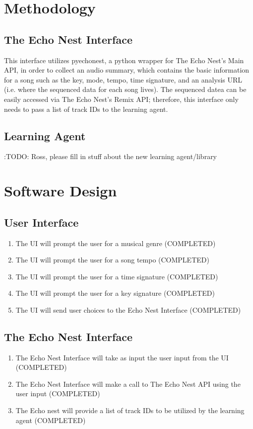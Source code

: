 \documentclass{article}
\begin{document}
\section{Methodology}
\subsection{The Echo Nest Interface}
This interface utilizes pyechonest, a python wrapper for The Echo Nest's Main API, in order to collect an 
audio summary, which contains the basic information for a song such as the key, mode, tempo, time signature, 
and an analysis URL (i.e. where the sequenced data for each song lives). The sequenced datea
can be easily accessed via The Echo Nest's Remix API; therefore, this interface only needs to pass a list of
track IDs to the learning agent.

\subsection{Learning Agent}
\Large:{TODO: Ross, please fill in stuff about the new learning agent/library}

\section{Software Design}
\subsection{User Interface}
\begin{enumerate}
\item The UI will prompt the user for a musical genre (COMPLETED)
\item The UI will prompt the user for a song tempo (COMPLETED)
\item The UI will prompt the user for a time signature (COMPLETED)
\item The UI will prompt the user for a key signature (COMPLETED)
\item The UI will send user choices to the Echo Nest Interface (COMPLETED)
\end{enumerate}

\subsection{The Echo Nest Interface}
\begin{enumerate}
\item The Echo Nest Interface will take as input the user input from the UI (COMPLETED)
\item The Echo Nest Interface will make a call to The Echo Nest API using the user input (COMPLETED)
\item The Echo nest will provide a list of track IDs to be utilized by the learning agent (COMPLETED)
\end{enumerate}
\end{document}
